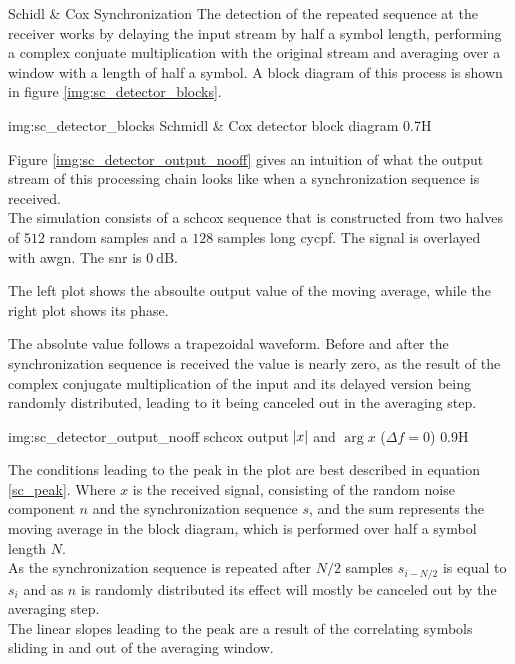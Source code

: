 \begin{subchapter}{Schidl \& Cox Synchronization}
  The detection of the repeated sequence at the receiver works by delaying
  the input stream by half a symbol length, performing a complex conjuate
  multiplication with the original stream and averaging over a window with
  a length of half a symbol.
  A block diagram of this process is shown in figure
  \ref{img:sc_detector_blocks}.

               {img:sc_detector_blocks}
               {Schmidl \& Cox detector block diagram}
               {0.7}{H}

  Figure \ref{img:sc_detector_output_nooff} gives an intuition
  of what the output stream of this processing chain looks like
  when a synchronization sequence is received. \\

  The simulation consists of a \gls{schcox} sequence
  that is constructed from two halves of $512$ random samples
  and a $128$ samples long \acrlong{cycpf}.
  The signal is overlayed with \acrlong{awgn}.
  The \gls{snr} is $\SI{0}{\deci\bel}$.

  The left plot shows the absoulte output value of
  the moving average, while the right plot shows its phase.

  The absolute value follows a trapezoidal waveform.
  Before and after the synchronization sequence is received
  the value is nearly zero, as the result of the complex
  conjugate multiplication of the input and its delayed version
  being randomly distributed, leading to it being canceled out
  in the averaging step.

               {img:sc_detector_output_nooff}
               {\acrshort{schcox} output $\abs{x}$ and $\arg{x}$ ($\Delta f=0$)}
               {0.9}{H}

  The conditions leading to the peak in the plot are best
  described in equation \ref{sc_peak}.
  Where $x$ is the received signal, consisting of the
  random noise component $n$ and the synchronization sequence $s$,
  and the sum represents the moving average in the block diagram,
  which is performed over half a symbol length $N$. \\

  As the synchronization sequence is repeated after $N/2$ samples
  $s_{i-N/2}$ is equal to $s_{i}$ and as $n$ is randomly distributed
  its effect will mostly be canceled out by the averaging step. \\

  The linear slopes leading to the peak are a result of the
  correlating symbols sliding in and out of the averaging
  window.


\end{subchapter}

